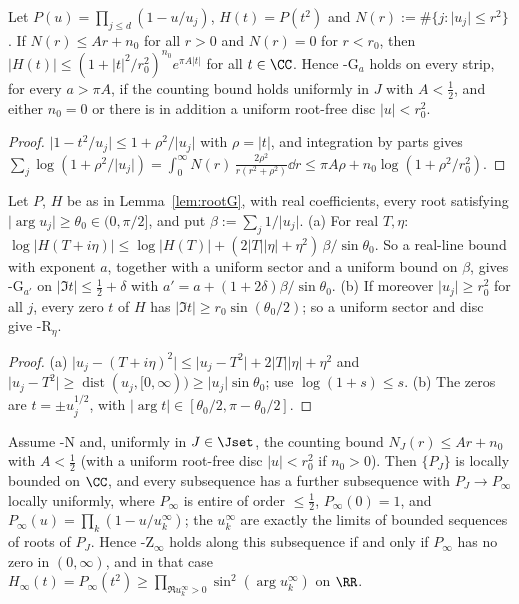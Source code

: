\begin{lemma}\label{lem:rootG}
Let $P(u)=\prod_{j\le d}(1-u/u_j)$, $H(t)=P(t^2)$ and $N(r):=\#\{j:\lvert u_j\rvert\le r^2\}$. If $N(r)\le Ar+n_0$ for all
$r>0$ and $N(r)=0$ for $r<r_0$, then $\lvert H(t)\rvert\le(1+\lvert t\rvert^2/r_0^2)^{n_0}e^{\pi A\lvert t\rvert}$ for all $t\in\CC$.
Hence \hyp{G$_a$} holds on every strip, for every $a>\pi A$, if the counting bound holds uniformly in $J$ with $A<\frac12$,
and either $n_0=0$ or there is in addition a uniform root-free disc $\lvert u\rvert<r_0^2$.
\end{lemma}

\begin{proof}
$\lvert1-t^2/u_j\rvert\le1+\rho^2/\lvert u_j\rvert$ with $\rho=\lvert t\rvert$, and integration by parts gives
$\sum_j\log(1+\rho^2/\lvert u_j\rvert)=\int_0^\infty N(r)\,\frac{2\rho^2}{r(r^2+\rho^2)}\dd r\le\pi A\rho+n_0\log(1+\rho^2/r_0^2)$.
\end{proof}

\begin{lemma}\label{lem:rootSR}
Let $P$, $H$ be as in Lemma~\ref{lem:rootG}, with real coefficients, every root satisfying
$\lvert\arg u_j\rvert\ge\theta_0\in(0,\pi/2]$, and put $\beta:=\sum_j1/\lvert u_j\rvert$.
(a) For real $T,\eta$: $\log\lvert H(T+i\eta)\rvert\le\log\lvert H(T)\rvert+(2\lvert T\rvert\lvert\eta\rvert+\eta^2)\,\beta/\sin\theta_0$.
So a real-line bound with exponent $a$, together with a uniform sector and a uniform bound on $\beta$, gives \hyp{G$_{a'}$}
on $\lvert\Im t\rvert\le\frac12+\delta$ with $a'=a+(1+2\delta)\beta/\sin\theta_0$.
(b) If moreover $\lvert u_j\rvert\ge r_0^2$ for all $j$, every zero $t$ of $H$ has $\lvert\Im t\rvert\ge r_0\sin(\theta_0/2)$; so a uniform
sector and disc give \hyp{R$_\eta$}.
\end{lemma}

\begin{proof}
(a) $\lvert u_j-(T+i\eta)^2\rvert\le\lvert u_j-T^2\rvert+2\lvert T\rvert\lvert\eta\rvert+\eta^2$ and
$\lvert u_j-T^2\rvert\ge\operatorname{dist}(u_j,[0,\infty))\ge\lvert u_j\rvert\sin\theta_0$; use $\log(1+s)\le s$. (b) The zeros are
$t=\pm u_j^{1/2}$, with $\lvert\arg t\rvert\in[\theta_0/2,\pi-\theta_0/2]$.
\end{proof}

\begin{proposition}\label{prop:Z}
Assume \hyp{N} and, uniformly in $J\in\Jset$, the counting bound $N_J(r)\le Ar+n_0$ with $A<\frac12$ (with a uniform
root-free disc $\lvert u\rvert<r_0^2$ if $n_0>0$). Then $\{P_J\}$ is locally bounded on $\CC$, and every subsequence has a
further subsequence with $P_J\to P_\infty$ locally uniformly, where $P_\infty$ is entire of order $\le\frac12$,
$P_\infty(0)=1$, and $P_\infty(u)=\prod_k(1-u/u_k^\infty)$; the $u_k^\infty$ are exactly the limits of bounded sequences of
roots of $P_J$. Hence \hyp{Z$_\infty$} holds along this subsequence if and only if $P_\infty$ has no zero in $(0,\infty)$,
and in that case $H_\infty(t)=P_\infty(t^2)\ge\prod_{\Re u_k^\infty>0}\sin^2(\arg u_k^\infty)$ on $\RR$.
\end{proposition}

